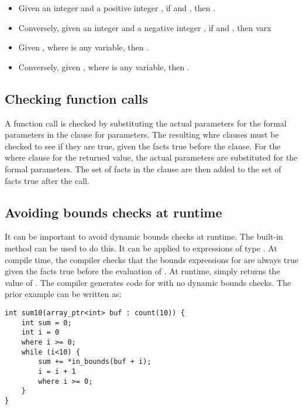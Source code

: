 \begin{itemize}
\item
  Given an integer  and a positive integer , if 
   \code{<=}  and  \code{+}  ,
  then  \code{+}  .
\item
  Conversely, given an integer  and a negative integer 
  , if  \code{<=}  and  \code{+}
    , then var{x} \code{+}  
\item
  Given  \code{<} , where  is any variable, 
  then  .
\item
  Conversely, given  \code{>} , where 
  is any variable, then  .
\end{itemize}

\subsection{Checking function calls}

A function call is checked by substituting the actual parameters for the
formal parameters in the  clause for parameters.  The
resulting whre clauses must be checked to see if they are true, given
the facts true before the clause.  For the where clause for the returned
value, the actual parameters are substituted for the formal parameters.
The set of facts in the clause are then added to the set of facts true
after the call.

\subsection{Avoiding bounds checks at runtime}
\label{section:avoiding-bounds-checks}

It can be important to avoid dynamic bounds checks at runtime. The
built-in method  can be used to do this. It can be applied
to expressions of type \arrayptr. At compile time, the compiler
checks that the bounds expressions for  are always true given the
facts true before the evaluation of . At runtime, 
simply returns the value of . The compiler generates code for
\code{*} with no dynamic bounds checks. The prior example
can be written as:

\begin{lstlisting}
int sum10(array_ptr<int> buf : count(10)) {
    int sum = 0;
    int i = 0
    where i >= 0;
    while (i<10) {
        sum += *in_bounds(buf + i);
        i = i + 1
        where i >= 0;
    }
}
\end{lstlisting}

